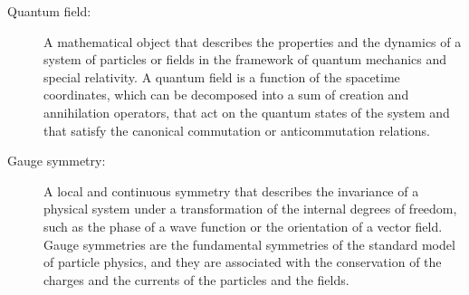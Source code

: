 \begin{tcolorbox}[colback=blue!5!white,colframe=blue!75!black,title=New terms]
    \begin{description}
        \item[Quantum field:] A mathematical object that describes the properties and the dynamics of a system of particles or fields in the framework of quantum mechanics and special relativity. A quantum field is a function of the spacetime coordinates, which can be decomposed into a sum of creation and annihilation operators, that act on the quantum states of the system and that satisfy the canonical commutation or anticommutation relations.
        \item[Gauge symmetry:] A local and continuous symmetry that describes the invariance of a physical system under a transformation of the internal degrees of freedom, such as the phase of a wave function or the orientation of a vector field. Gauge symmetries are the fundamental symmetries of the standard model of particle physics, and they are associated with the conservation of the charges and the currents of the particles and the fields.
    \end{description}
\end{tcolorbox}


